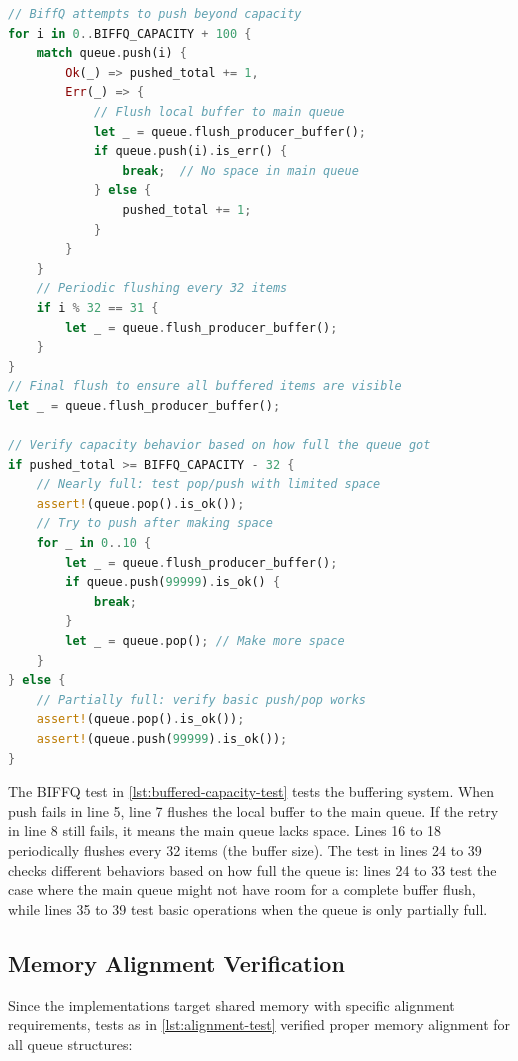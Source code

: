 \begin{lstlisting}[language=Rust, style=boxed, caption={Buffered queue capacity test}, label={lst:buffered-capacity-test}]
// BiffQ attempts to push beyond capacity
for i in 0..BIFFQ_CAPACITY + 100 {
    match queue.push(i) {
        Ok(_) => pushed_total += 1,
        Err(_) => {
            // Flush local buffer to main queue
            let _ = queue.flush_producer_buffer();
            if queue.push(i).is_err() {
                break;  // No space in main queue
            } else {
                pushed_total += 1;
            }
        }
    }
    // Periodic flushing every 32 items
    if i % 32 == 31 {
        let _ = queue.flush_producer_buffer();
    }
}
// Final flush to ensure all buffered items are visible
let _ = queue.flush_producer_buffer();

// Verify capacity behavior based on how full the queue got
if pushed_total >= BIFFQ_CAPACITY - 32 {
    // Nearly full: test pop/push with limited space
    assert!(queue.pop().is_ok());
    // Try to push after making space
    for _ in 0..10 {
        let _ = queue.flush_producer_buffer();
        if queue.push(99999).is_ok() {
            break;
        }
        let _ = queue.pop(); // Make more space
    }
} else {
    // Partially full: verify basic push/pop works
    assert!(queue.pop().is_ok());
    assert!(queue.push(99999).is_ok());
}
\end{lstlisting}

The \ac{BIFFQ} test in \cref{lst:buffered-capacity-test} tests the buffering system. When push fails in line 5, line 7 flushes the local buffer to the main queue. If the retry in line 8 still fails, it means the main queue lacks space. Lines 16 to 18 periodically flushes every 32 items (the buffer size). The test in lines 24 to 39 checks different behaviors based on how full the queue is: lines 24 to 33 test the case where the main queue might not have room for a complete buffer flush, while lines 35 to 39 test basic operations when the queue is only partially full.

\subsection{Memory Alignment Verification}
Since the implementations target shared memory with specific alignment requirements, tests as in \cref{lst:alignment-test} verified proper memory alignment for all queue structures:

